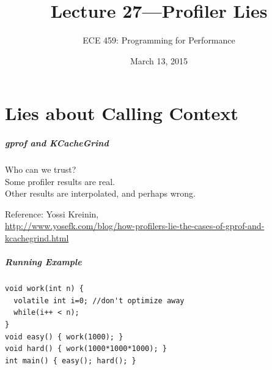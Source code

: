 \documentclass[aspectratio=43]{beamer}
\title{Lecture 27---Profiler Lies}
\subtitle{ECE 459: Programming for Performance}
\date{March 13, 2015}
\newenvironment{changemargin}[1]{%
  \begin{list}{}{%
    \setlength{\topsep}{0pt}%
    \setlength{\leftmargin}{#1}%
    \setlength{\rightmargin}{1em}
    \setlength{\listparindent}{\parindent}%
    \setlength{\itemindent}{\parindent}%
    \setlength{\parsep}{\parskip}%
  }%
  \item[]}{\end{list}}
\begin{document}
\begin{frame}[plain]
  \titlepage
\end{frame}

\part{Lies about Calling Context}

\begin{frame}
  \partpage
\end{frame}

\begin{frame}
  \frametitle{gprof and KCacheGrind}
  
  \begin{changemargin}{2cm}
    Who can we trust?\\[1em]

    Some profiler results are real. \\
    Other results are interpolated, and perhaps wrong.
  \end{changemargin}

  \begin{center}
    Reference: Yossi Kreinin,\\
  \tiny
  \url{http://www.yosefk.com/blog/how-profilers-lie-the-cases-of-gprof-and-kcachegrind.html}
  \end{center}

\end{frame}

\begin{frame}[fragile]
  \frametitle{Running Example}

  \begin{center}
  \begin{minipage}{.7\textwidth}
\begin{lstlisting}
void work(int n) {
  volatile int i=0; //don't optimize away
  while(i++ < n);
}
void easy() { work(1000); }
void hard() { work(1000*1000*1000); }
int main() { easy(); hard(); }
\end{lstlisting}
  \end{minipage}
  \end{center}
  
\end{frame}
\end{document}
